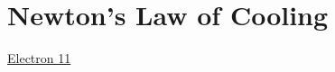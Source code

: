 \documentclass{ximera}
\begin{document}
\section{Newton's Law of Cooling}



\begin{exploration} \label{Edgvb5rthh}

\begin{onlineOnly}
    \begin{center}
\end{center}
\end{onlineOnly}

\href{https://www.desmos.com/calculator/yebumxuwms}{Electron 11}


\end{exploration}
\end{document}
